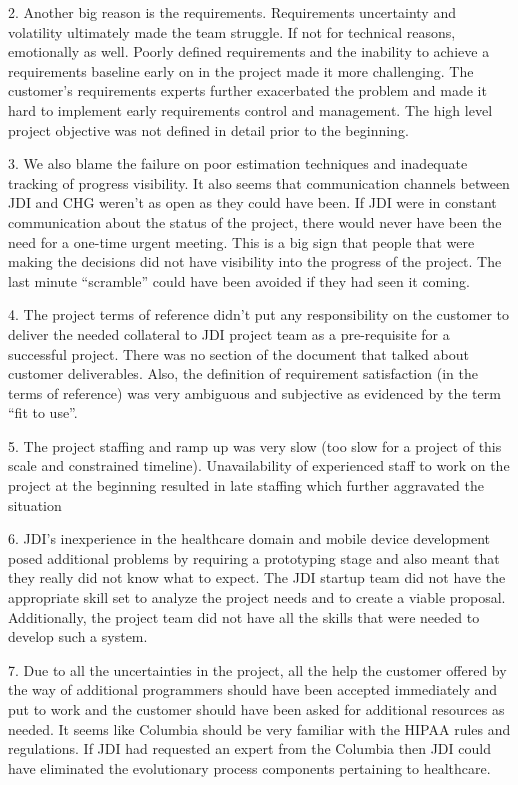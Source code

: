 \documentclass[12pt]{article}
\begin{document}
2.  Another big reason is the requirements.  Requirements uncertainty and volatility ultimately made
the team struggle.  If not for technical reasons, emotionally as well.  Poorly defined requirements
and the inability to achieve a requirements baseline early on in the project made it more
challenging.  The customer’s requirements experts further exacerbated the problem and made it hard
to implement early requirements control and management.  The high level project objective was not
defined in detail prior to the beginning.

3.  We also blame the failure on poor estimation techniques and inadequate tracking of progress
visibility.  It also seems that communication channels between JDI and CHG weren't as open as they
could have been.  If JDI were in constant communication about the status of the project, there would
never have been the need for a one-time urgent meeting.  This is a big sign that people that were
making the decisions did not have visibility into the progress of the project.  The last minute
“scramble” could have been avoided if they had seen it coming.

4.  The project terms of reference didn’t put any responsibility on the customer to deliver the
needed collateral to JDI project team as a pre-requisite for a successful project.  There was no
section of the document that talked about customer deliverables.  Also, the definition of
requirement satisfaction (in the terms of reference) was very ambiguous and subjective as evidenced
by the term “fit to use”.

5.  The project staffing and ramp up was very slow (too slow for a project of this scale and
constrained timeline).  Unavailability of experienced staff to work on the project at the beginning
resulted in late staffing which further aggravated the situation

6.  JDI’s inexperience in the healthcare domain and mobile device development posed additional
problems by requiring a prototyping stage and also meant that they really did not know what to
expect.  The JDI startup team did not have the appropriate skill set to analyze the project needs
and to create a viable proposal.  Additionally, the project team did not have all the skills that
were needed to develop such a system.

7.  Due to all the uncertainties in the project, all the help the customer offered by the way of
additional programmers should have been accepted immediately and put to work and the customer should
have been asked for additional resources as needed.  It seems like Columbia should be very familiar
with the HIPAA rules and regulations.  If JDI had requested an expert from the Columbia then JDI
could have eliminated the evolutionary process components pertaining to healthcare.
\end{document}
